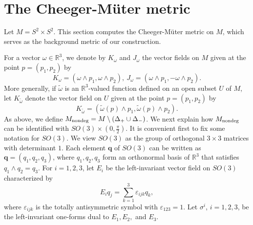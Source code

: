 \documentclass[11pt]{amsart}
\theoremstyle{definition}
\begin{document}
\section{The Cheeger-M\"uter metric}\label{sec:Mueter.metric}

Let $M = S^2 \times S^2$. This section computes the Cheeger-M\"uter metric on $M$, which serves as the background metric of our construction.

For a vector $\omega\in\mathbb{R}^3$, we denote by $K_\omega$ and $J_\omega$ the vector fields on $M$ given at the point $p=(p_1,p_2)$ by
\[
K_\omega = (\omega\wedge p_1, \omega\wedge p_2),\ J_\omega=(\omega\wedge p_1, -\omega\wedge p_2).
\]
More generally, if $\tilde{\omega}$ is an $\mathbb{R}^3$-valued function defined on an open subset $U$ of $M$, let $K_{\tilde{\omega}}$ denote the vector field on $U$ given at the point $p=(p_1,p_2)$ by
\[
K_{\tilde{\omega}}= (\tilde{\omega}(p)\wedge p_1,\tilde{\omega}(p)\wedge p_2).
\]
As above, we define $M_{\text{\rm nondeg}} = M \setminus (\Delta_+ \cup \Delta_-)$. We next explain how $M_{\text{\rm nondeg}}$ can be identified with $SO(3)\times (0,\frac{\pi}{2})$. It is convenient first to fix some notation for $SO(3)$.
We view $SO(3)$ as the group of orthogonal $3\times 3$ matrices with determinant $1$.
Each element $\mathbf{q}$ of $SO(3)$ can be written as $\mathbf{q}=(q_1,q_2,q_3)$, where $q_1,q_2,q_3$ form an orthonormal basis of $\mathbb{R}^3$ that satisfies $q_1\wedge q_2=q_3$.
For $i=1,2,3$, let $E_i$ be the left-invariant vector field on $SO(3)$ characterized by
\[
E_iq_j=\sum_{k=1}^3\varepsilon_{ijk}q_k,
\]
where $\varepsilon_{ijk}$ is the totally antisymmetric symbol with $\varepsilon_{123}=1$.
Let $\sigma^i$, $i=1,2,3$, be the left-invariant one-forms dual to $E_1, E_2,$ and $E_3$.
\end{document}
